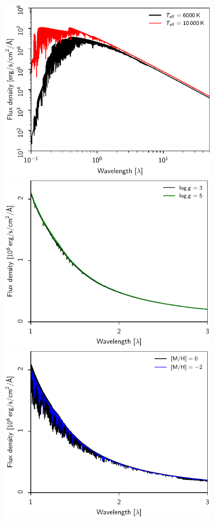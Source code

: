 \documentclass{aa}
\begin{document}
\begin{figure}
\includegraphics[width=\columnwidth]{figs/gaia/star_SED_Teff.pdf}
\includegraphics[width=\columnwidth]{figs/gaia/star_SED_logg.pdf}
\includegraphics[width=\columnwidth]{figs/gaia/star_SED_MH.pdf}

\end{figure}
\end{document}
